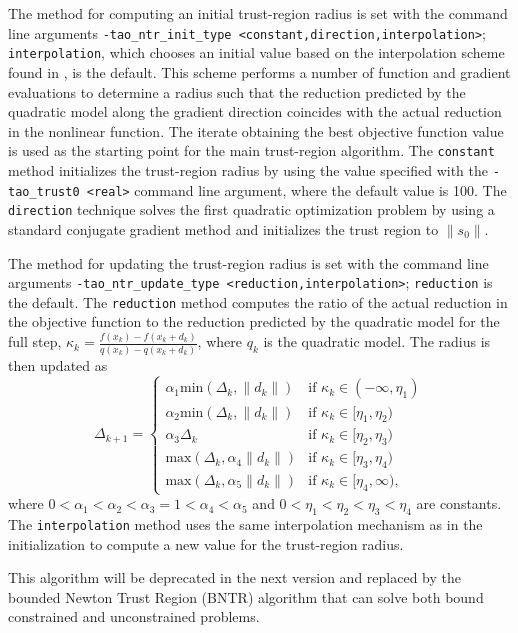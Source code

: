 \documentclass[]{book}
\begin{document}
The method for computing an initial trust-region radius is set with the 
command line arguments {\tt -tao\_ntr\_init\_type <constant,direction,interpolation>};
{\tt interpolation}, which chooses an initial value based on the 
interpolation scheme found in \cite{CGT}, is the default.  This
scheme performs a number of function and gradient evaluations to determine 
a radius such that the reduction predicted by the quadratic model along the 
gradient direction coincides with the actual reduction in the nonlinear 
function.  The iterate obtaining the best objective function value is 
used as the starting point for the main trust-region algorithm.  The 
{\tt constant} method initializes the trust-region radius by using 
the value specified with the {\tt -tao\_trust0 <real>} command line 
argument, where the default value is 100.  The {\tt direction} technique 
solves the first quadratic optimization problem by using a standard 
conjugate gradient method and initializes the trust region to 
$\|s_0\|$.

The method for updating the trust-region radius is set with the 
command line arguments 
{\tt -tao\_ntr\_update\_type <reduction,interpolation>}; {\tt reduction} 
is the default.  The {\tt reduction} method computes the ratio of the 
actual reduction in the objective function to the reduction predicted 
by the quadratic model for the full step, 
$\kappa_k = \frac{f(x_k) - f(x_k + d_k)}{q(x_k) - q(x_k + d_k)}$, where 
$q_k$ is the quadratic model.  The radius is then updated as
\[
\Delta_{k+1} = \left\{\begin{array}{ll}
\alpha_1 \mbox{min}(\Delta_k, \|d_k\|) & \mbox{if } \kappa_k \in (-\infty, \eta_1) \\
\alpha_2 \mbox{min}(\Delta_k, \|d_k\|) & \mbox{if } \kappa_k \in [\eta_1, \eta_2) \\
\alpha_3 \Delta_k & \mbox{if } \kappa_k \in [\eta_2, \eta_3) \\
\mbox{max}(\Delta_k, \alpha_4 \|d_k\|) & \mbox{if } \kappa_k \in [\eta_3, \eta_4) \\
\mbox{max}(\Delta_k, \alpha_5 \|d_k\|) & \mbox{if } \kappa_k \in [\eta_4, \infty),
\end{array}
\right.
\]
where $0 < \alpha_1 < \alpha_2 < \alpha_3 = 1 < \alpha_4 < \alpha_5$ and
$0 < \eta_1 < \eta_2 < \eta_3 < \eta_4$ are constants.  The {\tt interpolation}
method uses the same interpolation mechanism as in the initialization to
compute a new value for the trust-region radius.

This algorithm will be deprecated in the next version and replaced by the 
bounded Newton Trust Region (BNTR) algorithm that can solve both bound constrained 
and unconstrained problems.
\end{document}
